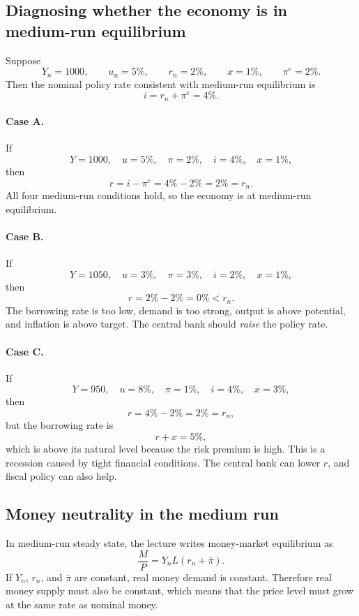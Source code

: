 \documentclass[12pt]{article}
\begin{document}
\subsection{Diagnosing whether the economy is in medium-run equilibrium}

\begin{examplebox}[title={Worked Example: Medium-run checklist and central-bank response}]
Suppose
\[
Y_n=1000,\qquad u_n=5\%,\qquad r_n=2\%,\qquad x=1\%,\qquad \pi^e=2\%.
\]
Then the nominal policy rate consistent with medium-run equilibrium is
\[
i=r_n+\pi^e=4\%.
\]

\paragraph{Case A.}
If
\[
Y=1000,\quad u=5\%,\quad \pi=2\%,\quad i=4\%,\quad x=1\%,
\]
then
\[
r=i-\pi^e=4\%-2\%=2\%=r_n.
\]
All four medium-run conditions hold, so the economy is at medium-run equilibrium.

\paragraph{Case B.}
If
\[
Y=1050,\quad u=3\%,\quad \pi=3\%,\quad i=2\%,\quad x=1\%,
\]
then
\[
r=2\%-2\%=0\%<r_n.
\]
The borrowing rate is too low, demand is too strong, output is above potential, and inflation is above target. The central bank should \emph{raise} the policy rate.

\paragraph{Case C.}
If
\[
Y=950,\quad u=8\%,\quad \pi=1\%,\quad i=4\%,\quad x=3\%,
\]
then
\[
r=4\%-2\%=2\%=r_n,
\]
but the borrowing rate is
\[
r+x=5\%,
\]
which is above its natural level because the risk premium is high. This is a recession caused by tight financial conditions. The central bank can lower \(r\), and fiscal policy can also help.
\end{examplebox}

\subsection{Money neutrality in the medium run}

In medium-run steady state, the lecture writes money-market equilibrium as
\[
\frac{M}{P}=Y_nL(r_n+\bar{\pi}).
\]
If $Y_n$, $r_n$, and $\bar{\pi}$ are constant, real money demand is constant. Therefore real money supply must also be constant, which means that the price level must grow at the same rate as nominal money.
\end{document}
